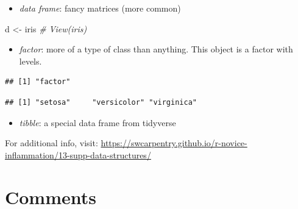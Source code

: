 \documentclass[
]{book}
\newenvironment{Shaded}{\begin{snugshade}}{\end{snugshade}}
\newcommand{\CommentTok}[1]{\textcolor[rgb]{0.56,0.35,0.01}{\textit{#1}}}
\newcommand{\FunctionTok}[1]{\textcolor[rgb]{0.00,0.00,0.00}{#1}}
\newcommand{\NormalTok}[1]{#1}
\newcommand{\OtherTok}[1]{\textcolor[rgb]{0.56,0.35,0.01}{#1}}
\newcommand{\SpecialCharTok}[1]{\textcolor[rgb]{0.00,0.00,0.00}{#1}}
\providecommand{\tightlist}{%
  \setlength{\itemsep}{0pt}\setlength{\parskip}{0pt}}
\begin{document}
\begin{itemize}
\tightlist
\item
  \emph{data frame}: fancy matrices (more common)
\end{itemize}

\begin{Shaded}
\begin{Highlighting}[]
\NormalTok{d }\OtherTok{\textless{}{-}}\NormalTok{ iris}
\CommentTok{\# View(iris)}
\end{Highlighting}
\end{Shaded}

\begin{itemize}
\tightlist
\item
  \emph{factor}: more of a type of class than anything. This object is a factor with levels.
\end{itemize}

\begin{Shaded}
\end{Shaded}

\begin{verbatim}
## [1] "factor"
\end{verbatim}

\begin{Shaded}
\end{Shaded}

\begin{verbatim}
## [1] "setosa"     "versicolor" "virginica"
\end{verbatim}

\begin{itemize}
\tightlist
\item
  \emph{tibble}: a special data frame from tidyverse
\end{itemize}

For additional info, visit: \url{https://swcarpentry.github.io/r-novice-inflammation/13-supp-data-structures/}

\hypertarget{comments}{%
\section{Comments}\label{comments}}
\end{document}
